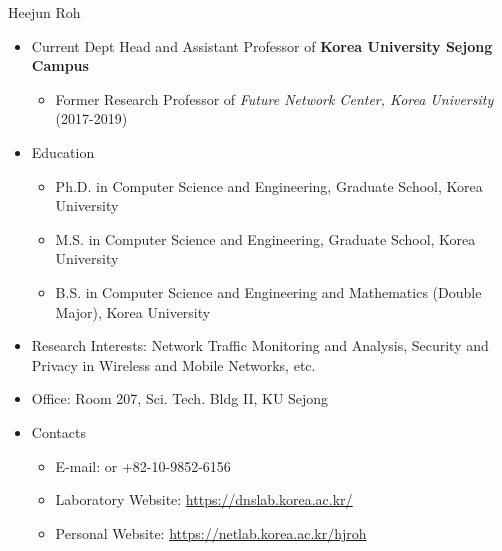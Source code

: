 \titleframe

\begin{frame}{Heejun Roh}
  \begin{itemize}
  \item Current Dept Head and Assistant Professor of {\bf Korea University Sejong Campus}
    \begin{itemize}
      \item Former Research Professor of {\em Future Network Center, Korea University} (2017-2019)
    \end{itemize}
  \item Education
  \begin{itemize}
    \item Ph.D. in Computer Science and Engineering, Graduate School, Korea University
    \item M.S. in Computer Science and Engineering, Graduate School, Korea University
    \item B.S. in Computer Science and Engineering and Mathematics (Double Major), Korea University
  \end{itemize}  
  \item Research Interests: Network Traffic Monitoring and Analysis, Security and Privacy in Wireless and Mobile Networks, etc.
  \item Office: Room 207, Sci. Tech. Bldg II, KU Sejong
  \item Contacts
    \begin{itemize}
      \item E-mail:  or +82-10-9852-6156
      \item Laboratory Website: \url{https://dnslab.korea.ac.kr/}
      \item Personal Website: \url{https://netlab.korea.ac.kr/hjroh}
    \end{itemize}
  \end{itemize}
\end{frame}


